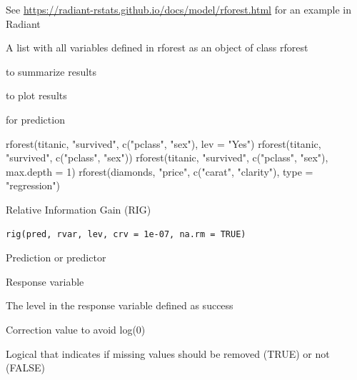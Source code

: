 \documentclass[a4paper]{book}
\begin{document}
%
\begin{Details}
See \url{https://radiant-rstats.github.io/docs/model/rforest.html} for an example in Radiant
\end{Details}
%
\begin{Value}
A list with all variables defined in rforest as an object of class rforest
\end{Value}
%
\begin{SeeAlso}
 to summarize results

 to plot results

 for prediction
\end{SeeAlso}
%
\begin{Examples}
\begin{ExampleCode}
rforest(titanic, "survived", c("pclass", "sex"), lev = "Yes") %
rforest(titanic, "survived", c("pclass", "sex")) %
rforest(titanic, "survived", c("pclass", "sex"), max.depth = 1)
rforest(diamonds, "price", c("carat", "clarity"), type = "regression") %

\end{ExampleCode}
\end{Examples}
%
\begin{Description}
Relative Information Gain (RIG)
\end{Description}
%
\begin{Usage}
\begin{verbatim}
rig(pred, rvar, lev, crv = 1e-07, na.rm = TRUE)
\end{verbatim}
\end{Usage}
%
\begin{Arguments}
\begin{ldescription}
\item[\code{pred}] Prediction or predictor

\item[\code{rvar}] Response variable

\item[\code{lev}] The level in the response variable defined as success

\item[\code{crv}] Correction value to avoid log(0)

\item[\code{na.rm}] Logical that indicates if missing values should be removed (TRUE) or not (FALSE)
\end{ldescription}
\end{Arguments}
\end{document}
